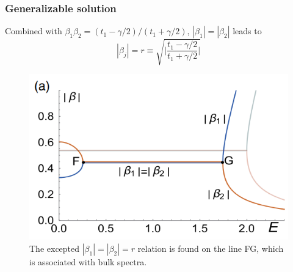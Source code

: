 \documentclass{beamer}
\begin{document}
  \begin{frame}
  \frametitle{Generalizable solution}
  Combined with $\beta_1\beta_2=(t_1-\gamma/2)/(t_1+\gamma/2)$, $|\beta_1|=|\beta_2|$ leads to 
  \begin{equation}
  |\beta_j|=r\equiv\sqrt{\rvert\frac{t_1-\gamma/2}{t_1+\gamma/2}\rvert}\label{gbz}
  \end{equation}
  \begin{figure}
  \includegraphics[scale=0.5]{figure/beta.png}
  \caption{The excepted $|\beta_1|=|\beta_2|=r$ relation is found on the line FG, which is associated with bulk spectra.}
  \end{figure}
\end{frame}
\end{document}

